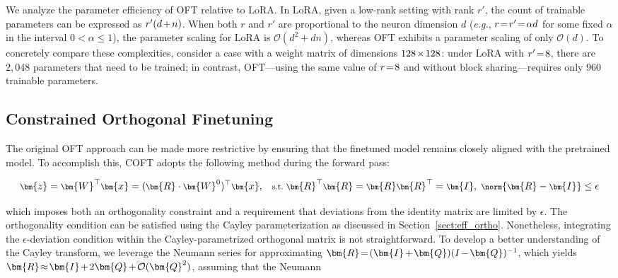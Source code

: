 We analyze the parameter efficiency of OFT relative to LoRA. In LoRA, given a low-rank setting with rank $r'$, the count of trainable parameters can be expressed as $\thickmuskip=2mu \medmuskip=2mu r'(d+n)$. When both $r$ and $r'$ are proportional to the neuron dimension $d$ (\emph{e.g.}, $\thickmuskip=2mu \medmuskip=2mu r=r'=\alpha d$ for some fixed $\alpha$ in the interval $0<\alpha\leq 1$), the parameter scaling for LoRA is $\mathcal{O}(d^2+dn)$, whereas OFT exhibits a parameter scaling of only $\mathcal{O}(d)$. To concretely compare these complexities, consider a case with a weight matrix of dimensions $\thickmuskip=2mu \medmuskip=2mu 128\times 128$: under LoRA with $\thickmuskip=2mu \medmuskip=2mu r'=8$, there are $2,048$ parameters that need to be trained; in contrast, OFT—using the same value of $\thickmuskip=2mu \medmuskip=2mu r=8$ and without block sharing—requires only $960$ trainable parameters.

\subsection{Constrained Orthogonal Finetuning}

The original OFT approach can be made more restrictive by ensuring that the finetuned model remains closely aligned with the pretrained model. To accomplish this, COFT adopts the following method during the forward pass:

\begin{equation}\label{eq:coft_general}
    \footnotesize
    \bm{z}=\bm{W}^\top\bm{x}=(\bm{R}\cdot\bm{W}^0)^\top\bm{x},~~~\text{s.t.}~\bm{R}^\top\bm{R}=\bm{R}\bm{R}^\top=\bm{I},~\norm{\bm{R}-\bm{I}}\leq \epsilon
\end{equation}

which imposes both an orthogonality constraint and a requirement that deviations from the identity matrix are limited by $\epsilon$. The orthogonality condition can be satisfied using the Cayley parameterization as discussed in Section~\ref{sect:eff_ortho}. Nonetheless, integrating the $\epsilon$-deviation condition within the Cayley-parametrized orthogonal matrix is not straightforward. To develop a better understanding of the Cayley transform, we leverage the Neumann series for approximating $\thickmuskip=2mu \medmuskip=2mu \bm{R}=(\bm{I}+\bm{Q})(I-\bm{Q})^{-1}$, which yields $\thickmuskip=2mu \medmuskip=2mu \bm{R}\approx\bm{I}+2\bm{Q}+\mathcal{O}(\bm{Q}^2)$, assuming that the Neumann { \parfillskip=0pt\par}

